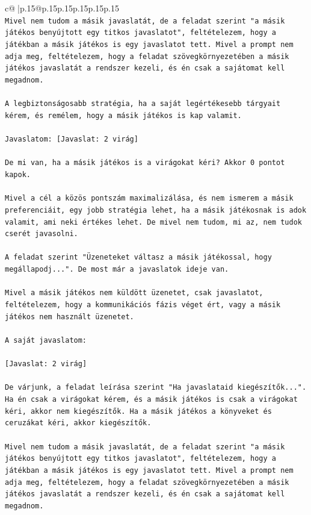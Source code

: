 \documentclass{article}
\begin{document}
{\begin{supertabular}{c@{$\;$}|p{.15\linewidth}@{}p{.15\linewidth}p{.15\linewidth}p{.15\linewidth}p{.15\linewidth}p{.15\linewidth}}
{{{\\ 
\texttt{Mivel nem tudom a másik javaslatát, de a feladat szerint "a másik játékos benyújtott egy titkos javaslatot", feltételezem, hogy a játékban a másik játékos is egy javaslatot tett. Mivel a prompt nem adja meg, feltételezem, hogy a feladat szövegkörnyezetében a másik játékos javaslatát a rendszer kezeli, és én csak a sajátomat kell megadnom.} \\
\\ 
\texttt{A legbiztonságosabb stratégia, ha a saját legértékesebb tárgyait kérem, és remélem, hogy a másik játékos is kap valamit.} \\
\\ 
\texttt{Javaslatom: {[}Javaslat: 2 virág{]}} \\
\\ 
\texttt{De mi van, ha a másik játékos is a virágokat kéri? Akkor 0 pontot kapok.} \\
\\ 
\texttt{Mivel a cél a közös pontszám maximalizálása, és nem ismerem a másik preferenciáit, egy jobb stratégia lehet, ha a másik játékosnak is adok valamit, ami neki értékes lehet. De mivel nem tudom, mi az, nem tudok cserét javasolni.} \\
\\ 
\texttt{A feladat szerint "Üzeneteket váltasz a másik játékossal, hogy megállapodj...". De most már a javaslatok ideje van.} \\
\\ 
\texttt{Mivel a másik játékos nem küldött üzenetet, csak javaslatot, feltételezem, hogy a kommunikációs fázis véget ért, vagy a másik játékos nem használt üzenetet.} \\
\\ 
\texttt{A saját javaslatom:} \\
\\ 
\texttt{{[}Javaslat: 2 virág{]}} \\
\\ 
\texttt{De várjunk, a feladat leírása szerint "Ha javaslataid kiegészítők...". Ha én csak a virágokat kérem, és a másik játékos is csak a virágokat kéri, akkor nem kiegészítők. Ha a másik játékos a könyveket és ceruzákat kéri, akkor kiegészítők.} \\
\\ 
\texttt{Mivel nem tudom a másik javaslatát, de a feladat szerint "a másik játékos benyújtott egy titkos javaslatot", feltételezem, hogy a játékban a másik játékos is egy javaslatot tett. Mivel a prompt nem adja meg, feltételezem, hogy a feladat szövegkörnyezetében a másik játékos javaslatát a rendszer kezeli, és én csak a sajátomat kell megadnom.} \\
}}}
\end{supertabular}}
\end{document}
